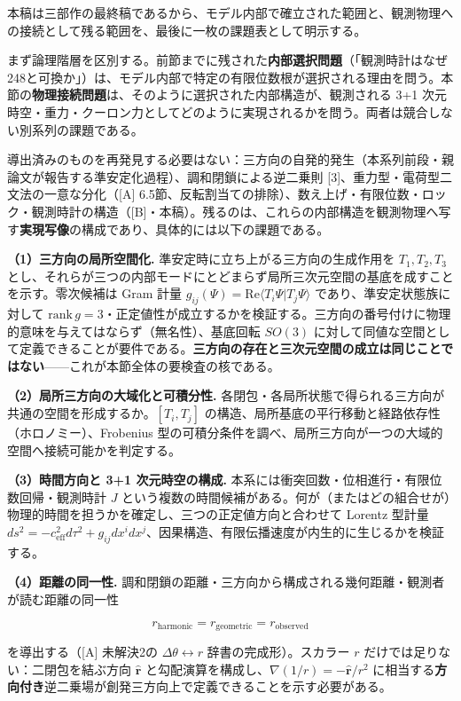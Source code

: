 \documentclass[
  a4paper,
]{ltjsarticle}
\begin{document}
本稿は三部作の最終稿であるから、モデル内部で確立された範囲と、観測物理への接続として残る範囲を、最後に一枚の課題表として明示する。

まず論理階層を区別する。前節までに残された\textbf{内部選択問題}（「観測時計はなぜ248と可換か」）は、モデル内部で特定の有限位数根が選択される理由を問う。本節の\textbf{物理接続問題}は、そのように選択された内部構造が、観測される
3+1
次元時空・重力・クーロン力としてどのように実現されるかを問う。両者は競合しない別系列の課題である。

導出済みのものを再発見する必要はない：三方向の自発的発生（本系列前段・親論文が報告する準安定化過程）、調和閉鎖による逆二乗則
{[}3{]}、重力型・電荷型二文法の一意な分化（{[}A{]}
6.5節、反転割当ての排除）、数え上げ・有限位数・ロック・観測時計の構造（{[}B{]}・本稿）。残るのは、これらの内部構造を観測物理へ写す\textbf{実現写像}の構成であり、具体的には以下の課題である。

\textbf{（1）三方向の局所空間化.} 準安定時に立ち上がる三方向の生成作用を
\(T_1,T_2,T_3\)
とし、それらが三つの内部モードにとどまらず局所三次元空間の基底を成すことを示す。零次候補は
Gram 計量 \(g_{ij}(\Psi)=\mathrm{Re}\langle T_i\Psi|T_j\Psi\rangle\)
であり、準安定状態族に対して
\(\mathrm{rank}\,g=3\)・正定値性が成立するかを検証する。三方向の番号付けに物理的意味を与えてはならず（無名性）、基底回転
\(SO(3)\)
に対して同値な空間として定義できることが要件である。\textbf{三方向の存在と三次元空間の成立は同じことではない}------これが本節全体の要検査の核である。

\textbf{（2）局所三方向の大域化と可積分性.}
各閉包・各局所状態で得られる三方向が共通の空間を形成するか。\([T_i,T_j]\)
の構造、局所基底の平行移動と経路依存性（ホロノミー）、Frobenius
型の可積分条件を調べ、局所三方向が一つの大域的空間へ接続可能かを判定する。

\textbf{（3）時間方向と 3+1 次元時空の構成.}
本系には衝突回数・位相進行・有限位数回帰・観測時計 \(J\)
という複数の時間候補がある。何が（またはどの組合せが）物理的時間を担うかを確定し、三つの正定値方向と合わせて
Lorentz 型計量
\(ds^2=-c_{\mathrm{eff}}^2 d\tau^2+g_{ij}dx^i dx^j\)、因果構造、有限伝播速度が内生的に生じるかを検証する。

\textbf{（4）距離の同一性.}
調和閉鎖の距離・三方向から構成される幾何距離・観測者が読む距離の同一性

\[
r_{\mathrm{harmonic}}=r_{\mathrm{geometric}}=r_{\mathrm{observed}}
\]

を導出する（{[}A{]} 未解決2の \(\Delta\theta\leftrightarrow r\)
辞書の完成形）。スカラー \(r\) だけでは足りない：二閉包を結ぶ方向
\(\hat{\mathbf r}\)
と勾配演算を構成し、\(\nabla(1/r)=-\hat{\mathbf r}/r^2\)
に相当する\textbf{方向付き}逆二乗場が創発三方向上で定義できることを示す必要がある。
\end{document}
